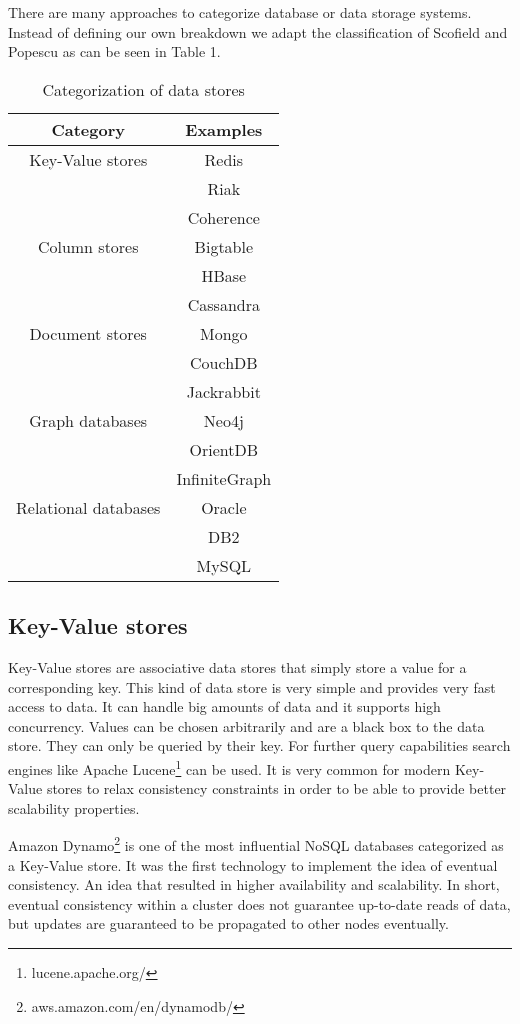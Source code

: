 \documentclass{sig-alternate}
\begin{document}
There are many approaches to categorize database or data storage systems. Instead of defining our own breakdown we adapt the classification of Scofield and Popescu\cite{scofield:classification} as can be seen in Table 1.

\begin{table}
\centering
\caption{Categorization of data stores}
\begin{tabular}{|c|c|} \hline
Category             & Examples\\
\hline
Key-Value stores     & Redis\\ 
 					 & Riak\\ 
 					 & Coherence\\
\hline
Column stores        & Bigtable\\ 
 					 & HBase\\ 
 					 & Cassandra\\
\hline
Document stores      & Mongo\\ 
 					 & CouchDB\\ 
 					 & Jackrabbit\\
\hline
Graph databases      & Neo4j\\ 
 					 & OrientDB\\ 
 					 & InfiniteGraph\\
\hline
Relational databases & Oracle\\ 
 					 & DB2\\ 
 					 & MySQL\\
\hline\end{tabular}
\end{table}

\subsection{Key-Value stores}

Key-Value stores are associative data stores that simply store a value for a corresponding key. This kind of data store is very simple and provides very fast access to data. It can handle big amounts of data and it supports high concurrency. Values can be chosen arbitrarily and are a black box to the data store. They can only be queried by their key. For further query capabilities search engines like Apache Lucene\footnote{lucene.apache.org/} can be used.
It is very common for modern Key-Value stores to relax consistency constraints in order to be able to provide better scalability properties.\cite{strauch:nosql}

Amazon Dynamo\footnote{aws.amazon.com/en/dynamodb/} is one of the most influential NoSQL databases categorized as a Key-Value store. It was the first technology to implement the idea of eventual consistency. An idea that resulted in higher availability and scalability. In short, eventual consistency within a cluster does not guarantee up-to-date reads of data, but updates are guaranteed to be propagated to other nodes eventually.
\end{document}
